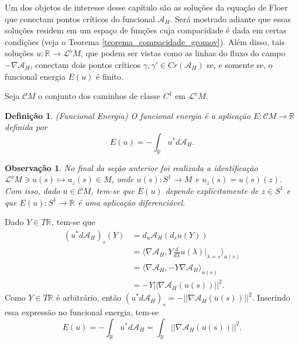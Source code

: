 \documentclass[12pt]{book}
\newtheorem{definicao}[teorema]{Definição}
\newtheorem{observacao}[teorema]{Observação}
\newcommand{\circulo}{S^{1}}
\newcommand{\derivada}[2]{\frac{d #1}{d #2}}
\newcommand{\funcionalH}{\mathcal{A}_{H}}
\newcommand{\gradientefuncional}{\nabla \funcionalH}
\newcommand{\norma}[1]{||#1||}
\newcommand{\pontoscriticos}[1]{\textit{Cr}(#1)}
\newcommand{\produtointerno}[2]{\langle #1, #2 \rangle}
\newcommand{\real}[1]{\mathbb{R}^{#1}}
\newcommand{\reta}{\real{}}
\newcommand{\lacocontrateis}{\mathcal{L}^{o}M}
\newcommand{\cilindrosLM}{\mathcal{C}M}
\begin{document}
	Um dos objetos de interesse desse capítulo são as soluções da equação de Floer que conectam pontos críticos do funcional $\funcionalH$. Será mostrado adiante que essas soluções residem em um espaço de funções cuja compacidade é dada em certas condições (veja o Teorema \ref{teorema_compacidade_gromov}). Além disso, tais soluções $u:\reta\to \lacocontrateis$, que podem ser vistas como as linhas do fluxo do campo $-\gradientefuncional$, conectam dois pontos críticos $\gamma, \gamma'\in \pontoscriticos{\funcionalH}$ se, e somente se, o funcional energia $E(u)$ é finito.
	
	Seja $\cilindrosLM$ o conjunto dos caminhos de classe $C^{1}$ em $\lacocontrateis$.
	
	\begin{definicao}
		(Funcional Energia) O funcional energia é a aplicação $E: \cilindrosLM \to \reta$ definida por
		$$
		E(u) = -\int_{\reta}u^{*}d\funcionalH.
		$$
	\end{definicao}
	
	\begin{observacao}
		No final da seção anterior foi realizada a identificação $\lacocontrateis \ni u(s) \mapsto u_{z}(s)\in M $, onde $u(s):\circulo\to M$ e $u_{z}(s) = u(s)(z)$.
		Com isso, dado $u \in \cilindrosLM$, tem-se que $E(u)$ depende explícitamente de $z \in \circulo$ e que $E(u):\circulo\to \reta$ é uma aplicação diferenciável.
	\end{observacao}
	
	Dado $Y \in T\reta$, tem-se que
	$$
	\begin{aligned}
	(u^{*}d\funcionalH)_{s}(Y) &= d_{u}\funcionalH(d_{s}u(Y))
	\\
	&=\produtointerno{\gradientefuncional}{Y\derivada{}{\lambda}u(\lambda)|_{\lambda=s}}_{u(s)}
	\\
	&=\produtointerno{\gradientefuncional}{-Y\gradientefuncional}_{u(s)}
	\\
	&=-Y\norma{\gradientefuncional(u(s))}^{2}.
	\end{aligned}
	$$
	Como $Y\in T\reta$ é arbitrário, então $(u^{*}d\funcionalH)_{s} = -\norma{\gradientefuncional(u(s))}^{2}$. Inserindo essa expressão no funcional energia, tem-se
	$$
	E(u)=-\int_{\reta}u^{*}d\funcionalH = \int_{\reta}\norma{\gradientefuncional(u(s))}^{2}.
	$$
	
\end{document}
